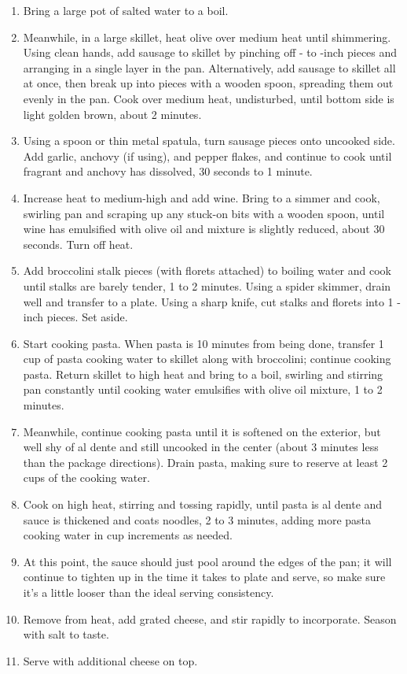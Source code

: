 \begin{enumerate}
  \item Bring a large pot of salted water to a boil.
  \item Meanwhile, in a large skillet, heat olive over medium heat until shimmering. Using clean hands, add sausage to skillet by pinching off - to -inch pieces and arranging in a single layer in the pan. Alternatively, add sausage to skillet all at once, then break up into pieces with a wooden spoon, spreading them out evenly in the pan. Cook over medium heat, undisturbed, until bottom side is light golden brown, about 2 minutes.
  \item Using a spoon or thin metal spatula, turn sausage pieces onto uncooked side. Add garlic, anchovy (if using), and pepper flakes, and continue to cook until fragrant and anchovy has dissolved, 30 seconds to 1 minute.
  \item Increase heat to medium-high and add wine. Bring to a simmer and cook, swirling pan and scraping up any stuck-on bits with a wooden spoon, until wine has emulsified with olive oil and mixture is slightly reduced, about 30 seconds. Turn off heat.
  \item Add broccolini stalk pieces (with florets attached) to boiling water and cook until stalks are barely tender, 1  to 2 minutes. Using a spider skimmer, drain well and transfer to a plate. Using a sharp knife, cut stalks and florets into 1 -inch pieces. Set aside.
  \item Start cooking pasta. When pasta is 10 minutes from being done, transfer 1 cup of pasta cooking water to skillet along with broccolini; continue cooking pasta. Return skillet to high heat and bring to a boil, swirling and stirring pan constantly until cooking water emulsifies with olive oil mixture, 1 to 2 minutes.
  \item Meanwhile, continue cooking pasta until it is softened on the exterior, but well shy of al dente and still uncooked in the center (about 3 minutes less than the package directions). Drain pasta, making sure to reserve at least 2 cups of the cooking water.
  \item Cook on high heat, stirring and tossing rapidly, until pasta is al dente and sauce is thickened and coats noodles, 2 to 3 minutes, adding more pasta cooking water in  cup increments as needed.
  \item At this point, the sauce should just pool around the edges of the pan; it will continue to tighten up in the time it takes to plate and serve, so make sure it's a little looser than the ideal serving consistency.
  \item Remove from heat, add grated cheese, and stir rapidly to incorporate. Season with salt to taste.
  \item Serve with additional cheese on top.
\end{enumerate}
